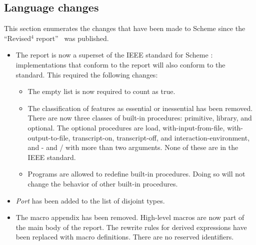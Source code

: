 


\subsection*{Language changes}
\label{differences}

This section enumerates the changes that have been made to Scheme since
the ``Revised$^4$ report''~\cite{R4RS} was published.

\begin{itemize}

\item The report is now a superset of the IEEE standard for Scheme
\cite{IEEEScheme}: implementations that conform to the report will
also conform to the standard.  This required the following changes:
\begin{itemize}

\item The empty list is now required to count as true.

\item The classification of features as essential or inessential has been
removed.  There are now three classes of built-in procedures: primitive,
library, and optional.  The optional procedures are {\cf load},
{\cf with-input-from-file}, {\cf with-output-\linebreak[0]to-file},
{\cf transcript-\linebreak[0]on}, {\cf transcript-\linebreak[0]off}, and
{\cf interaction-\linebreak[0]environment},
and {\cf -} and {\cf /} with more than two arguments.
None of these are in the IEEE standard.

\item Programs are allowed to redefine built-in procedures.  Doing so
will not change the behavior of other built-in procedures.
\end{itemize}

\item {\em Port} has been added to the list of disjoint types.

\item The macro appendix has been removed.  High-level macros are now part
of the main body of the report.  The rewrite rules for derived expressions
have been replaced with macro definitions.  There are no reserved identifiers.


\end{itemize}
